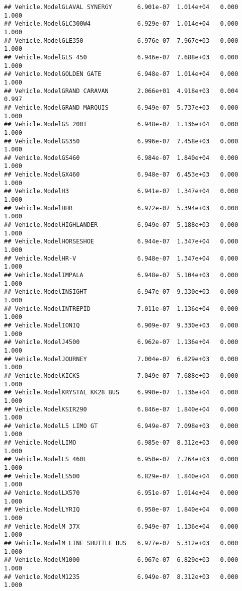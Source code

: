 \documentclass[
]{article}
\begin{document}
\begin{verbatim}
## Vehicle.ModelGLAVAL SYNERGY       6.901e-07  1.014e+04   0.000    1.000
## Vehicle.ModelGLC300W4             6.929e-07  1.014e+04   0.000    1.000
## Vehicle.ModelGLE350               6.976e-07  7.967e+03   0.000    1.000
## Vehicle.ModelGLS 450              6.946e-07  7.688e+03   0.000    1.000
## Vehicle.ModelGOLDEN GATE          6.948e-07  1.014e+04   0.000    1.000
## Vehicle.ModelGRAND CARAVAN        2.066e+01  4.918e+03   0.004    0.997
## Vehicle.ModelGRAND MARQUIS        6.949e-07  5.737e+03   0.000    1.000
## Vehicle.ModelGS 200T              6.948e-07  1.136e+04   0.000    1.000
## Vehicle.ModelGS350                6.996e-07  7.458e+03   0.000    1.000
## Vehicle.ModelGS460                6.984e-07  1.840e+04   0.000    1.000
## Vehicle.ModelGX460                6.948e-07  6.453e+03   0.000    1.000
## Vehicle.ModelH3                   6.941e-07  1.347e+04   0.000    1.000
## Vehicle.ModelHHR                  6.972e-07  5.394e+03   0.000    1.000
## Vehicle.ModelHIGHLANDER           6.949e-07  5.188e+03   0.000    1.000
## Vehicle.ModelHORSESHOE            6.944e-07  1.347e+04   0.000    1.000
## Vehicle.ModelHR-V                 6.948e-07  1.347e+04   0.000    1.000
## Vehicle.ModelIMPALA               6.948e-07  5.104e+03   0.000    1.000
## Vehicle.ModelINSIGHT              6.947e-07  9.330e+03   0.000    1.000
## Vehicle.ModelINTREPID             7.011e-07  1.136e+04   0.000    1.000
## Vehicle.ModelIONIQ                6.909e-07  9.330e+03   0.000    1.000
## Vehicle.ModelJ4500                6.962e-07  1.136e+04   0.000    1.000
## Vehicle.ModelJOURNEY              7.004e-07  6.829e+03   0.000    1.000
## Vehicle.ModelKICKS                7.049e-07  7.688e+03   0.000    1.000
## Vehicle.ModelKRYSTAL KK28 BUS     6.990e-07  1.136e+04   0.000    1.000
## Vehicle.ModelKSIR290              6.846e-07  1.840e+04   0.000    1.000
## Vehicle.ModelL5 LIMO GT           6.949e-07  7.098e+03   0.000    1.000
## Vehicle.ModelLIMO                 6.985e-07  8.312e+03   0.000    1.000
## Vehicle.ModelLS 460L              6.950e-07  7.264e+03   0.000    1.000
## Vehicle.ModelLS500                6.829e-07  1.840e+04   0.000    1.000
## Vehicle.ModelLX570                6.951e-07  1.014e+04   0.000    1.000
## Vehicle.ModelLYRIQ                6.950e-07  1.840e+04   0.000    1.000
## Vehicle.ModelM 37X                6.949e-07  1.136e+04   0.000    1.000
## Vehicle.ModelM LINE SHUTTLE BUS   6.977e-07  5.312e+03   0.000    1.000
## Vehicle.ModelM1000                6.967e-07  6.829e+03   0.000    1.000
## Vehicle.ModelM1235                6.949e-07  8.312e+03   0.000    1.000

\end{verbatim}
\end{document}
